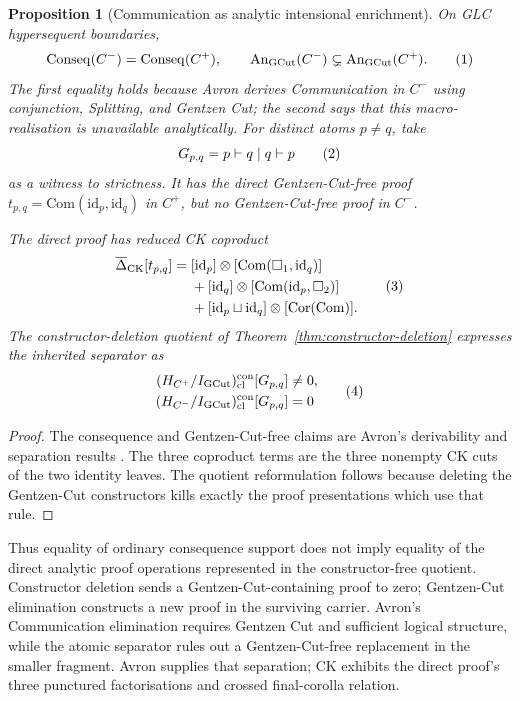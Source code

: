 \documentclass[10pt,a4paper]{article}
\theoremstyle{plain}
\newtheorem{proposition}[theorem]{Proposition}
\theoremstyle{definition}
\theoremstyle{remark}
\newcommand{\ms}{\mathrel{\vdash}}
\newcommand{\fjoin}{\mathbin{\sqcup}}
\newcommand{\eqtag}{\refstepcounter{equation}\tag{\theequation}}
\begin{document}
\begin{proposition}[Communication as analytic intensional enrichment]
\label{prop:communication-analytic-conservativity}
On GLC hypersequent boundaries,
\[
 \operatorname{Conseq}(C^-)=\operatorname{Conseq}(C^+),
 \qquad
 \operatorname{An}_{\mathrm{GCut}}(C^-)
   \subsetneq
 \operatorname{An}_{\mathrm{GCut}}(C^+).
\eqtag\label{eq:communication-support-separation}
\]
The first equality holds because Avron derives Communication in \(C^-\)
using conjunction, Splitting, and Gentzen Cut; the second says that this
macro-realisation is unavailable analytically.  For distinct atoms
\(p\ne q\), take
\[
                    G_{p,q}=p\ms q\mid q\ms p
\eqtag\label{eq:communication-atomic-witness}
\]
as a witness to strictness.  It has the direct Gentzen-Cut-free proof
\(t_{p,q}=\mathrm{Com}(\mathrm{id}_p,\mathrm{id}_q)\) in \(C^+\), but no
Gentzen-Cut-free proof in \(C^-\).

The direct proof has reduced CK coproduct
\[
\begin{aligned}
 \overline\Delta_{\mathrm{CK}}[t_{p,q}]
  ={}&
 [\mathrm{id}_p]\otimes
   [\mathrm{Com}(\Box_1,\mathrm{id}_q)]\\
 &+[\mathrm{id}_q]\otimes
   [\mathrm{Com}(\mathrm{id}_p,\Box_2)]\\
 &+[\mathrm{id}_p\fjoin\mathrm{id}_q]\otimes
 [\operatorname{Cor}(\mathrm{Com})].
\end{aligned}
\eqtag\label{eq:communication-analytic-cut}
\]
The constructor-deletion quotient of
Theorem~\ref{thm:constructor-deletion} expresses the inherited separator as
\[
\begin{aligned}
 (H_{C^+}/I_{\mathrm{GCut}})_{\mathrm{cl}}^{\mathrm{con}}[G_{p,q}]
   &\ne0,\\
 (H_{C^-}/I_{\mathrm{GCut}})_{\mathrm{cl}}^{\mathrm{con}}[G_{p,q}]
   &=0
\end{aligned}
\eqtag\label{eq:communication-cut-free-quotient-separation}
\]
\end{proposition}

\begin{proof}
The consequence and Gentzen-Cut-free claims are Avron's derivability and
separation results
\cite[\S III.2.1, Theorem~1]{avron1996hypersequents}.
The three coproduct terms are the three nonempty CK cuts of the two
identity leaves.  The quotient reformulation follows because deleting the
Gentzen-Cut constructors kills exactly the proof presentations which use
that rule.
\end{proof}

Thus equality of ordinary consequence support does not imply equality of
the direct analytic proof operations represented in the
constructor-free quotient.
Constructor deletion sends a Gentzen-Cut-containing proof to zero;
Gentzen-Cut elimination constructs a new proof in the surviving carrier.
Avron's Communication elimination requires Gentzen Cut and sufficient
logical structure, while the atomic separator rules out a Gentzen-Cut-free
replacement in the smaller fragment.  Avron supplies that separation; CK
exhibits the direct proof's three punctured factorisations and crossed
final-corolla relation.
\end{document}
